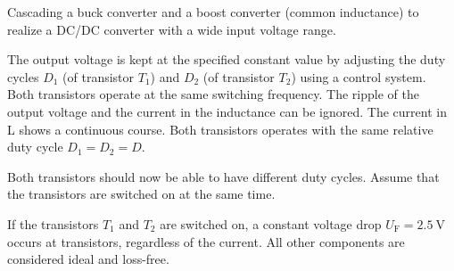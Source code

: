 
Cascading a buck converter and a boost converter (common inductance) to realize a DC/DC converter with a wide input voltage range.





The output voltage is kept at the specified constant value by adjusting the duty cycles $D_1$ 
(of transistor  $T_1$) and $D_2$ (of transistor $T_2$) using a control system. Both transistors operate at the same switching frequency.
The ripple of the output voltage and the current in the inductance can be ignored. The current in L shows a continuous course.
Both transistors operates with the same relative duty cycle $D_1 = D_2 = D$.


\vspace{2em}\par
Both transistors should now be able to have different duty cycles. Assume that the transistors are switched on at the same time.

\vspace{2em}\par
If the transistors $T_1$ and $T_2$ are switched on, a constant voltage drop $U_\mathrm{F}=\SI{2.5}{\volt}$ occurs at transistors,
 regardless of the current. All other components are considered ideal and loss-free.

